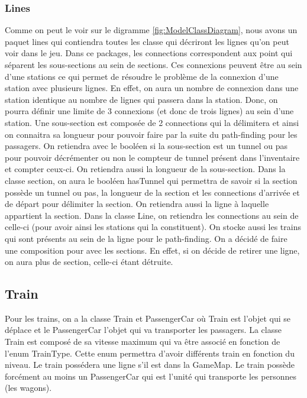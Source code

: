 \documentclass[report, backcover, french, nodocumentinfo]{upmethodology-document}
\begin{document}
			\subsubsection{Lines}
			Comme on peut le voir sur le digramme \ref{fig:ModelClassDiagram}, nous avons un paquet lines qui contiendra toutes les classe qui décriront les lignes qu'on peut voir dans le jeu. Dans ce packages, les connections correspondent aux point qui séparent les sous-sections au sein de sections. Ces connexions peuvent être au sein d'une stations ce qui permet de résoudre le problème de la connexion d'une station avec plusieurs lignes. En effet, on aura un nombre de connexion dans une station identique au nombre de lignes qui passera dans la station. Donc, on pourra définir une limite de 3 connexions (et donc de trois lignes) au sein d'une station.
			Une sous-section est composée de 2 connections qui la délimitera et ainsi on connaitra sa longueur pour pouvoir faire par la suite du path-finding pour les passagers. On retiendra avec le booléen si la sous-section est un tunnel ou pas pour pouvoir décrémenter ou non le compteur de tunnel présent dans l'inventaire et compter ceux-ci. On retiendra aussi la longueur de la sous-section. 
			Dans la classe section, on aura le booléen hasTunnel qui permettra de savoir si la section possède un tunnel ou pas, la longueur de la section et les connections d'arrivée et de départ pour délimiter la section. On retiendra aussi la ligne à laquelle appartient la section.
			Dans la classe Line, on retiendra les connections au sein de celle-ci (pour avoir ainsi les stations qui la constituent). On stocke aussi les trains qui sont présents au sein de la ligne pour le path-finding. On a décidé de faire une composition pour avec les sections. En effet, si on décide de retirer une ligne, on aura plus de section, celle-ci étant détruite.
			\subsection{Train}
			Pour les trains, on a la classe Train et PassengerCar où Train est l'objet qui se déplace et le PassengerCar l'objet qui va transporter les passagers. La classe Train est composé de sa vitesse maximum qui va être associé en fonction de l'enum TrainType. Cette enum permettra d'avoir différents train en fonction du niveau. Le train possédera une ligne s'il est dans la GameMap. Le train possède forcément au moins un PassengerCar qui est l'unité qui transporte les personnes (les wagons).
\end{document}
